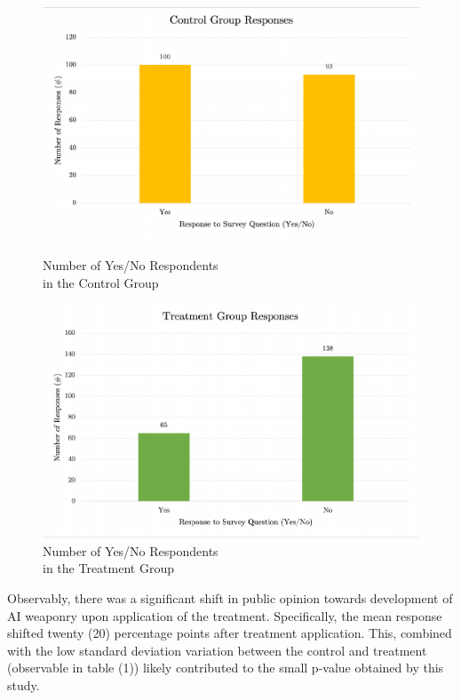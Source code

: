 \documentclass[12pt]{article}
\begin{document}
\begin{figure} [H]
\centering
\begin{minipage}{0.5\textwidth}
  \centering
  \includegraphics[width=0.9\linewidth]{ControlResponses.pdf}
  \caption{Number of Yes/No Respondents\\in the Control Group}
  \label{fig:test1}
\end{minipage}%
\begin{minipage}{.5\textwidth}
  \centering
  \includegraphics[width=0.9\linewidth]{TreatmentResponses.pdf}
  \caption{Number of Yes/No Respondents\\in the Treatment Group}
  \label{fig:test2}
\end{minipage}
\end{figure}
Observably, there was a significant shift in public opinion towards development of AI weaponry upon application of the treatment. Specifically, the mean response shifted twenty (20) percentage points after treatment application. This, combined with the low standard deviation variation between the control and treatment (observable in table (1)) likely contributed to the small p-value obtained by this study.
\end{document}
